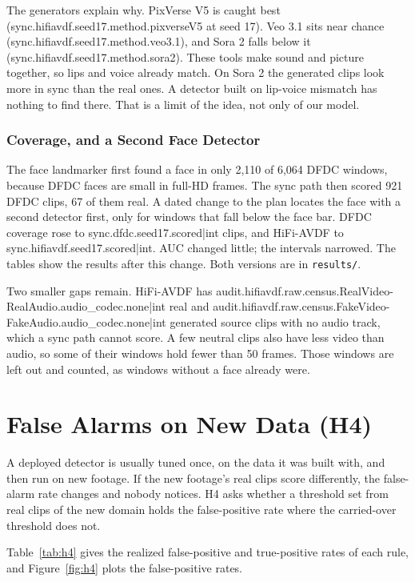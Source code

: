 The generators explain why. PixVerse V5 is caught best
({{sync.hifiavdf.seed17.method.pixverseV5}} at seed 17). Veo 3.1 sits near
chance ({{sync.hifiavdf.seed17.method.veo3.1}}), and Sora 2 falls below it
({{sync.hifiavdf.seed17.method.sora2}}). These tools make sound and picture
together, so lips and voice already match. On Sora 2 the generated clips look
more in sync than the real ones. A detector built on lip-voice mismatch has
nothing to find there. That is a limit of the idea, not only of our model.

\subsubsection{Coverage, and a Second Face Detector}

The face landmarker first found a face in only 2,110 of 6,064 DFDC windows,
because DFDC faces are small in full-HD frames. The sync path then scored 921
DFDC clips, 67 of them real. A dated change to the plan locates the face with a second
detector first, only for windows that fall below the face bar. DFDC coverage
rose to {{sync.dfdc.seed17.scored|int}} clips, and HiFi-AVDF to
{{sync.hifiavdf.seed17.scored|int}}. AUC changed little; the intervals
narrowed. The tables show the results after this change. Both versions are in
\texttt{results/}.

Two smaller gaps remain. HiFi-AVDF has
{{audit.hifiavdf.raw.census.RealVideo-RealAudio.audio_codec.none|int}} real and
{{audit.hifiavdf.raw.census.FakeVideo-FakeAudio.audio_codec.none|int}} generated
source clips with no audio track, which a sync path cannot score. A few
neutral clips also have less video than audio, so some of their windows hold
fewer than 50 frames. Those windows are left out and counted, as windows
without a face already were.

\section{False Alarms on New Data (H4)}
\label{sec:r-h4}

A deployed detector is usually tuned once, on the data it was built with, and
then run on new footage. If the new footage's real clips score differently,
the false-alarm rate changes and nobody notices. H4 asks whether a threshold
set from real clips of the new domain holds the false-positive rate where the
carried-over threshold does not.

Table~\ref{tab:h4} gives the realized false-positive and true-positive rates
of each rule, and Figure~\ref{fig:h4} plots the false-positive rates.

